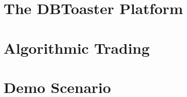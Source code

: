 \documentclass{vldb}
\begin{document}



\section{The DBToaster Platform}



\section{Algorithmic Trading}



\section{Demo Scenario}





\end{document}
